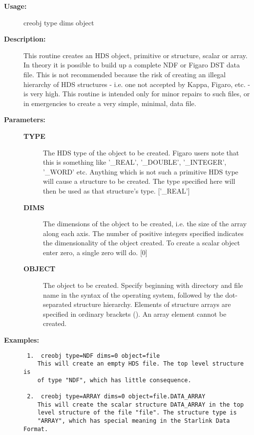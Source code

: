 \begin{description}

\item [{\bf Usage:}]
 creobj type dims object

\item [{\bf Description:}]
 This routine creates an HDS object, primitive or structure, scalar
 or array. In theory it is possible to build up a complete NDF or
 Figaro DST data file. This is not recommended because the risk of
 creating an illegal hierarchy of HDS structures - i.e. one not
 accepted by Kappa, Figaro, etc. - is very high. This routine is
 intended only for minor repairs to such files, or in emergencies
 to create a very simple, minimal, data file.

\item [{\bf Parameters:}]
\begin{description}
\item [{\bf TYPE}]
 The HDS type of the object to be created. Figaro users note
 that this is something like '_REAL', '_DOUBLE', '_INTEGER',
 '_WORD' etc. Anything which is not such a primitive HDS type
 will cause a structure to be created. The type specified here
 will then be used as that structure's type.
 ['_REAL']
\item [{\bf DIMS}]
 The dimensions of the object to be created, i.e. the size of
 the array along each axis. The number of positive integers
 specified indicates the dimensionality of the object created.
 To create a scalar object enter zero, a single zero will do.
 [0]
\item [{\bf OBJECT}]
 The object to be created. Specify beginning with directory and
 file name in the syntax of the operating system, followed by
 the dot-separated structure hierarchy. Elements of structure
 arrays are specified in ordinary brackets (). An array element
 cannot be created.
\end{description}

\item [{\bf Examples:}]
\begin{verbatim}
 1.  creobj type=NDF dims=0 object=file
    This will create an empty HDS file. The top level structure is
    of type "NDF", which has little consequence.

 2.  creobj type=ARRAY dims=0 object=file.DATA_ARRAY
    This will create the scalar structure DATA_ARRAY in the top
    level structure of the file "file". The structure type is
    "ARRAY", which has special meaning in the Starlink Data Format.


\end{verbatim}
\end{description}
